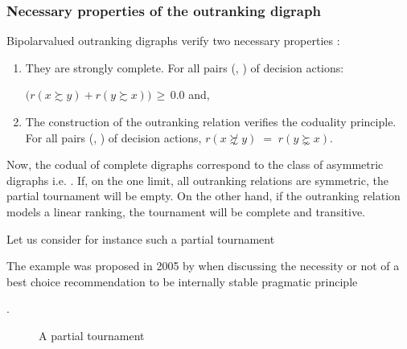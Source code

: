 \documentclass[a4paper,12pt,english]{sphinxhowto}
\let\sphinxpxdimen\pdfpxdimen\else\newdimen\sphinxpxdimen
\begin{document}
\subsubsection{Necessary properties of the outranking digraph}
\label{\detokenize{pearls:necessary-properties-of-the-outranking-digraph}}
\sphinxAtStartPar
Bipolar\sphinxhyphen{}valued outranking digraphs verify two necessary properties :
\begin{enumerate}
%
\item {} 
\sphinxAtStartPar
They are strongly complete. For all pairs (, ) of decision actions:

\sphinxAtStartPar
\(\big(r(x \succsim y) + r(y \succsim x)\big)\, \geqslant \, 0.0\) and,

\item {} 
\sphinxAtStartPar
The construction of the outranking relation verifies the coduality principle. For all pairs (, ) of decision actions, \(r(x \not\succsim y) \;=\; r(y \succnsim x)\).

\end{enumerate}

\sphinxAtStartPar
Now, the codual of complete digraphs correspond to the class of asymmetric digraphs i.e. . If, on the one limit, all outranking relations are symmetric, the partial tournament will be empty. On the other hand, if the outranking relation models a linear ranking, the tournament will be complete and transitive.

\sphinxAtStartPar
Let us consider for instance such a partial tournament %
\begin{footnote}[6]\sphinxAtStartFootnote
The example was proposed in 2005 by  when discussing the necessity or not of a best choice recommendation to be internally stable \textendash{}pragmatic principle \textendash{} 
%
\end{footnote}.

\begin{figure}[H]
\centering
\capstart

\noindent\sphinxincludegraphics[width=200\sphinxpxdimen]{{Bouyssou4Orig}.png}
\caption{A partial tournament}\label{\detokenize{pearls:bouyssou4orig}}\end{figure}
\end{document}
